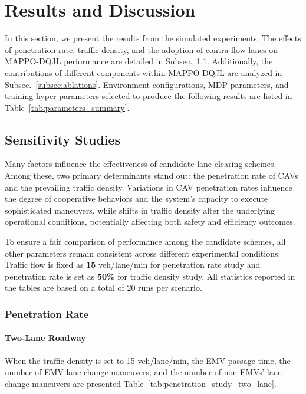 \section{Results and Discussion}
\label{sec:discussion}
In this section, we present the results from the simulated experiments. The effects of penetration rate, traffic density, and the adoption of contra-flow lanes on MAPPO-DQJL performance are detailed in Subsec.~\ref{subsec:sensitivity}. Additionally, the contributions of different components within MAPPO-DQJL are analyzed in Subsec.~\ref{subsec:ablations}. Environment configurations, MDP parameters, and training hyper-parameters selected to produce the following results are listed in Table~\ref{tab:parameters_summary}.


\subsection{Sensitivity Studies}\label{subsec:sensitivity}
Many factors influence the effectiveness of candidate lane-clearing schemes. Among these, two primary determinants stand out: the penetration rate of CAVs and the prevailing traffic density. Variations in CAV penetration rates influence the degree of cooperative behaviors and the system’s capacity to execute sophisticated maneuvers, while shifts in traffic density alter the underlying operational conditions, potentially affecting both safety and efficiency outcomes. 

To ensure a fair comparison of performance among the candidate schemes, all other parameters remain consistent across different experimental conditions. Traffic flow is fixed as \textbf{15} veh/lane/min for penetration rate study and penetration rate is set as \textbf{50\%} for traffic density study. All statistics reported in the tables are based on a total of 20 runs per scenario.

\subsubsection{Penetration Rate}
\paragraph{Two-Lane Roadway} When the traffic density is set to 15 veh/lane/min, the EMV passage time, the number of EMV lane-change maneuvers, and the number of non-EMVs’ lane-change maneuvers are presented Table~\ref{tab:penetration_study_two_lane}.

